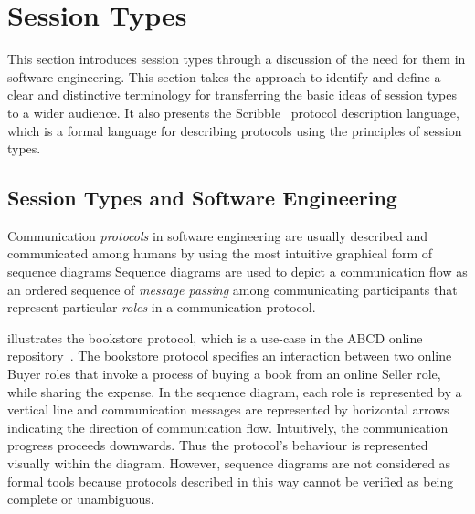 
\section{Session Types}
\label{sec:session_types}


This section introduces session types through 
a discussion of the need for them in
software engineering.
This section takes the approach to identify and define
a clear and distinctive terminology 
for transferring the basic ideas of session types to a wider audience.
It also presents the Scribble~\cite{scribble} protocol
description language, which is a formal language for describing
protocols using the principles of session types.

\subsection{Session Types and Software Engineering}%
\label{sec:sessions_software}



Communication \emph{protocols} in software engineering
are usually described and communicated among humans
by using the most intuitive graphical form of sequence diagrams 
Sequence diagrams are used to depict a communication flow as an ordered
sequence of \emph{message passing} among communicating
participants that represent particular \emph{roles} in a communication
protocol.

 illustrates the bookstore protocol, which is a use-case
in the ABCD online repository~\cite{usecase_repository}.
The bookstore protocol specifies an interaction between two online Buyer roles
that invoke a process of buying a book from an online Seller role, while
sharing the expense.
In the sequence diagram, each role is represented by a vertical line and
communication messages are represented by horizontal arrows
indicating the direction of communication flow.
Intuitively, the communication progress proceeds downwards.
Thus the protocol's behaviour is represented visually within the diagram.
However, sequence diagrams are not considered as formal tools because
protocols described in this way cannot be verified as being complete or unambiguous.

